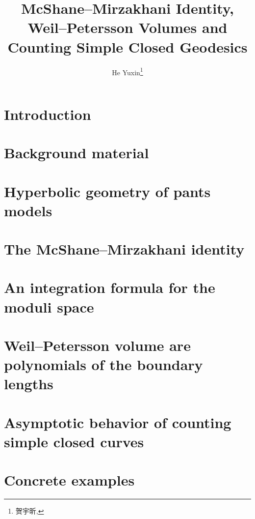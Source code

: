 \documentclass[twoside]{article}
\begin{document}
\title{McShane--Mirzakhani Identity,\\Weil–Petersson Volumes and\\Counting Simple Closed Geodesics}
\author{He Yuxin\footnote{贺宇昕, }}

\begin{abstract}

\end{abstract}

\section{Introduction} \label{intro}




\section{Background material} \label{backg}




\section{Hyperbolic geometry of pants models} \label{hypergeo}




\section{The McShane--Mirzakhani identity} \label{MMid}




\section{An integration formula for the moduli space} \label{intformula}




\section{Weil--Petersson volume are polynomials of the boundary lengths} \label{wpvolume}



\section{Asymptotic behavior of counting simple closed curves} \label{asym}




\section{Concrete examples} \label{conexamples}



\printbibliography
\end{document}
